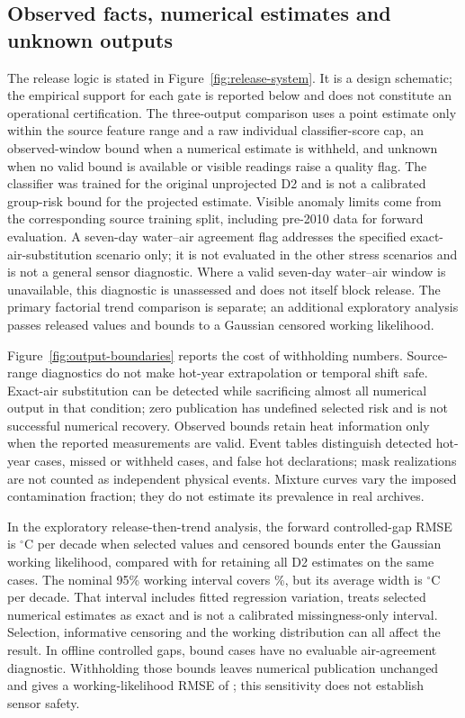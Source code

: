 \subsection{Observed facts, numerical estimates and unknown outputs}
The release logic is stated in Figure~\ref{fig:release-system}. It is a design schematic; the empirical support for each gate is reported below and does not constitute an operational certification.
The three-output comparison uses a point estimate only within the source feature range and a raw individual classifier-score cap, an observed-window bound when a numerical estimate is withheld, and unknown when no valid bound is available or visible readings raise a quality flag. The classifier was trained for the original unprojected D2 and is not a calibrated group-risk bound for the projected estimate. Visible anomaly limits come from the corresponding source training split, including pre-2010 data for forward evaluation. A seven-day water--air agreement flag addresses the specified exact-air-substitution scenario only; it is not evaluated in the other stress scenarios and is not a general sensor diagnostic. Where a valid seven-day water--air window is unavailable, this diagnostic is unassessed and does not itself block release. The primary factorial trend comparison is separate; an additional exploratory analysis passes released values and bounds to a Gaussian censored working likelihood.

Figure~\ref{fig:output-boundaries} reports the cost of withholding numbers. Source-range diagnostics do not make hot-year extrapolation or temporal shift safe. Exact-air substitution can be detected while sacrificing almost all numerical output in that condition; zero publication has undefined selected risk and is not successful numerical recovery. Observed bounds retain heat information only when the reported measurements are valid. Event tables distinguish detected hot-year cases, missed or withheld cases, and false hot declarations; mask realizations are not counted as independent physical events. Mixture curves vary the imposed contamination fraction; they do not estimate its prevalence in real archives.

In the exploratory release-then-trend analysis, the forward controlled-gap RMSE is \WASelectedRMSE{}$^{\circ}$C per decade when selected values and censored bounds enter the Gaussian working likelihood, compared with \WASelectedBaseRMSE{} for retaining all D2 estimates on the same cases. The nominal 95\% working interval covers \WASelectedCoverage\%, but its average width is \WASelectedWidth{}$^{\circ}$C per decade. That interval includes fitted regression variation, treats selected numerical estimates as exact and is not a calibrated missingness-only interval. Selection, informative censoring and the working distribution can all affect the result. In offline controlled gaps, \WAQualityUnassessed{} bound cases have no evaluable air-agreement diagnostic. Withholding those bounds leaves numerical publication unchanged and gives a working-likelihood RMSE of \WAQualityStrictRMSE{}; this sensitivity does not establish sensor safety.
